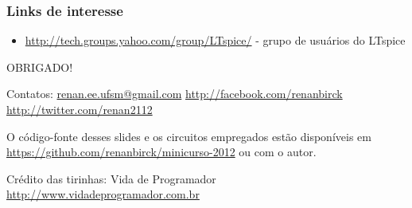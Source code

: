 \documentclass{beamer}
\begin{document}
\begin{frame}
\frametitle{Links de interesse}
\begin{itemize}
\item \url{http://tech.groups.yahoo.com/group/LTspice/} - grupo de usuários do LTspice
\end{itemize}
\end{frame}

\begin{frame}
{\LARGE OBRIGADO!}
\end{frame}

\begin{frame}
Contatos: \url{renan.ee.ufsm@gmail.com} \url{http://facebook.com/renanbirck} \url{http://twitter.com/renan2112}\newline

O código-fonte desses slides e os circuitos empregados estão disponíveis em \url{https://github.com/renanbirck/minicurso-2012} ou com o autor.

Crédito das tirinhas: Vida de Programador \url{http://www.vidadeprogramador.com.br}
\end{frame}
\end{document}
